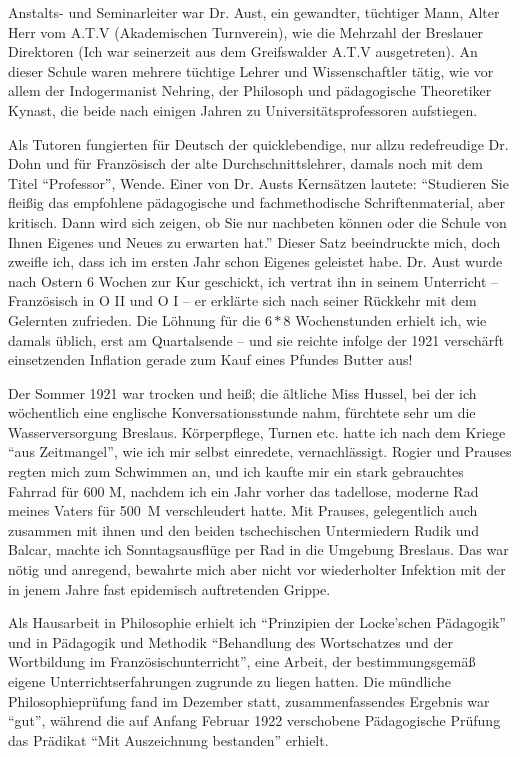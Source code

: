 Anstalts- und Seminarleiter war Dr. Aust, ein gewandter, tüchtiger Mann, Alter Herr vom A.T.V (Akademischen Turnverein), wie die Mehrzahl der Breslauer Direktoren (Ich war seinerzeit aus dem Greifswalder A.T.V ausgetreten). An dieser Schule waren mehrere tüchtige Lehrer und Wissenschaftler tätig, wie vor allem der Indogermanist Nehring, der Philosoph und pädagogische Theoretiker Kynast, die beide nach einigen Jahren zu Universitätsprofessoren aufstiegen.

Als Tutoren fungierten für Deutsch der quicklebendige, nur allzu redefreudige Dr. Dohn und für Französisch der alte Durchschnittslehrer, damals noch mit dem Titel \enquote{Professor}, Wende. Einer von Dr. Austs Kernsätzen lautete: \enquote{Studieren Sie fleißig das empfohlene pädagogische und fachmethodische Schriftenmaterial, aber kritisch. Dann wird sich zeigen, ob Sie nur nachbeten können oder die Schule von Ihnen Eigenes und Neues zu erwarten hat.} Dieser Satz beeindruckte mich, doch zweifle ich, dass ich im ersten Jahr schon Eigenes geleistet habe. Dr. Aust wurde nach Ostern 6 Wochen zur Kur geschickt, ich vertrat ihn in seinem Unterricht -- Französisch in O II und O I -- er erklärte sich nach seiner Rückkehr mit dem Gelernten zufrieden. Die Löhnung für die $6 * 8$ Wochenstunden erhielt ich, wie damals üblich, erst am Quartalsende -- und sie reichte infolge der 1921 verschärft einsetzenden Inflation gerade zum Kauf eines Pfundes Butter aus!

Der Sommer 1921 war trocken und heiß; die ältliche Miss Hussel, bei der ich wöchentlich eine englische Konversationsstunde nahm, fürchtete sehr um die Wasserversorgung Breslaus. Körperpflege, Turnen etc. hatte ich nach dem Kriege \enquote{aus Zeitmangel}, wie ich mir selbst einredete, vernachlässigt. Rogier und Prauses regten mich zum Schwimmen an, und ich kaufte mir ein stark gebrauchtes Fahrrad für 600 M, nachdem ich ein Jahr vorher das tadellose, moderne Rad meines Vaters für 500~M verschleudert hatte. Mit Prauses, gelegentlich auch zusammen mit ihnen und den beiden tschechischen Untermiedern Rudik und Balcar, machte ich Sonntagsausflüge per Rad in die Umgebung Breslaus. Das war nötig und anregend, bewahrte mich aber nicht vor wiederholter Infektion mit der in jenem Jahre fast epidemisch auftretenden Grippe.

Als Hausarbeit in Philosophie erhielt ich \enquote{Prinzipien der Locke'schen Pädagogik} und in Pädagogik und Methodik \enquote{Behandlung des Wortschatzes und der Wortbildung im Französischunterricht}, eine Arbeit, der bestimmungsgemäß eigene Unterrichtserfahrungen zugrunde zu liegen hatten. Die mündliche Philosophieprüfung fand im Dezember statt, zusammenfassendes Ergebnis war \enquote{gut}, während die auf Anfang Februar 1922 verschobene Pädagogische Prüfung das Prädikat \enquote{Mit Auszeichnung bestanden} erhielt.

